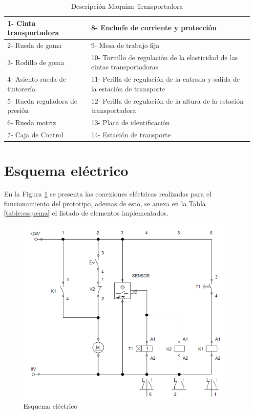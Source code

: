 \begin{table}[ht]
	\centering
	\begin{tabular}{|p{5cm}|p{8cm}|}
		\hline
		1- Cinta transportadora & 8- Enchufe de corriente y protección \\ 
		\hline
		2- Rueda de goma& 9- Mesa de trabajo fija\\
		\hline
		3- Rodillo de goma& 10- Tornillo de regulación de la elasticidad de las cintas transportadoras\\
		\hline
		4- Asiento rueda de tintorería& 11- Perilla de regulación de la entrada y salida de la estación de transporte\\
		\hline
		5- Rueda reguladora de presión& 12- Perilla de regulación de la altura de la estación transportadora\\
		\hline
		6- Rueda motriz& 13- Placa de identificación\\
		\hline
		7- Caja de Control& 14- Estación de transporte\\
		\hline
	\end{tabular}	
	\caption{Descripción Maquina Transportadora}
	\label{table:Banda}
\end{table}

\newpage
\section{Esquema eléctrico}
En la Figura \ref{fig:Esquema} se presenta las conexiones eléctricas realizadas para el funcionamiento del prototipo, ademas de esto, se anexa en la Tabla \ref{table:esquema} el listado de elementos implementados.  
\begin{figure}[ht]
	\centering
	\includegraphics[scale=0.5]{Figs/66.png}
	\caption{Esquema eléctrico}
	\label{fig:Esquema}
\end{figure}

